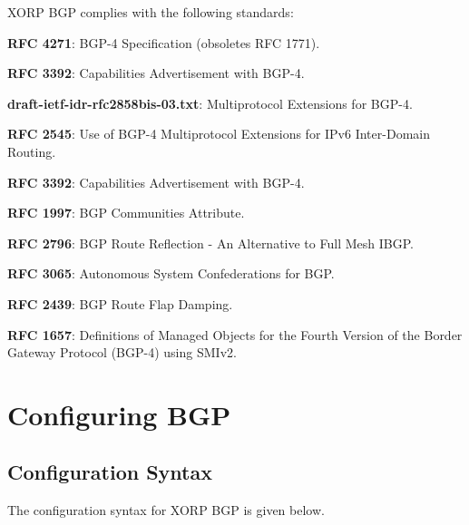 XORP BGP complies with the following standards:
\begin{description}
\item{\bf RFC 4271}: BGP-4 Specification (obsoletes RFC 1771).
\item{\bf RFC 3392}: Capabilities Advertisement with BGP-4.
\item{\bf draft-ietf-idr-rfc2858bis-03.txt}: Multiprotocol
     Extensions for BGP-4.
\item{\bf RFC 2545}: Use of BGP-4 Multiprotocol Extensions for IPv6
     Inter-Domain Routing.
\item{\bf RFC 3392}: Capabilities Advertisement with BGP-4.
\item{\bf RFC 1997}: BGP Communities Attribute.
\item{\bf RFC 2796}: BGP Route Reflection - An Alternative to Full Mesh
     IBGP.
\item{\bf RFC 3065}: Autonomous System Confederations for BGP.
\item{\bf RFC 2439}: BGP Route Flap Damping.
\item{\bf RFC 1657}: Definitions of Managed Objects for the Fourth Version
     of the Border Gateway Protocol (BGP-4) using SMIv2.
\end{description}

\newpage
\section{Configuring BGP}

\subsection{Configuration Syntax}

The configuration syntax for XORP BGP is given below.

